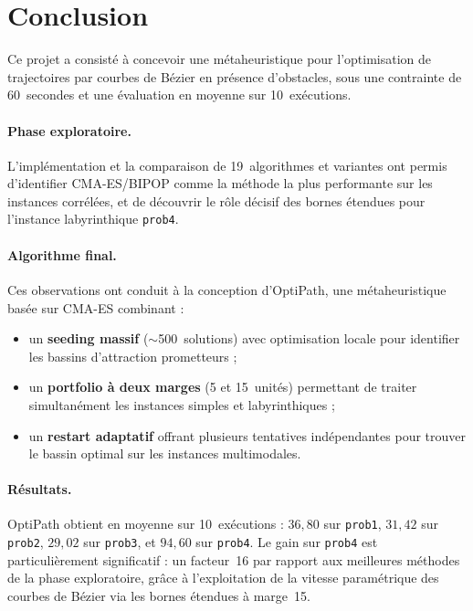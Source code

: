 \section{Conclusion}
\label{sec:conclusion}

Ce projet a consisté à concevoir une métaheuristique pour l'optimisation de
trajectoires par courbes de Bézier en présence d'obstacles, sous une contrainte
de 60~secondes et une évaluation en moyenne sur 10~exécutions.

\paragraph{Phase exploratoire.}
L'implémentation et la comparaison de 19~algorithmes et variantes ont permis
d'identifier CMA-ES/BIPOP comme la méthode la plus performante sur les
instances corrélées, et de découvrir le rôle décisif des bornes étendues pour
l'instance labyrinthique \texttt{prob4}.

\paragraph{Algorithme final.}
Ces observations ont conduit à la conception d'OptiPath, une métaheuristique
basée sur CMA-ES combinant :
\begin{itemize}[nosep]
  \item un \textbf{seeding massif} ($\sim$500~solutions) avec optimisation
        locale pour identifier les bassins d'attraction prometteurs ;
  \item un \textbf{portfolio à deux marges} (5 et 15~unités) permettant de
        traiter simultanément les instances simples et labyrinthiques ;
  \item un \textbf{restart adaptatif} offrant plusieurs tentatives
        indépendantes pour trouver le bassin optimal sur les instances
        multimodales.
\end{itemize}

\paragraph{Résultats.}
OptiPath obtient en moyenne sur 10~exécutions : $36{,}80$ sur \texttt{prob1},
$31{,}42$ sur \texttt{prob2}, $29{,}02$ sur \texttt{prob3}, et $94{,}60$ sur
\texttt{prob4}.  Le gain sur \texttt{prob4} est particulièrement significatif :
un facteur~16 par rapport aux meilleures méthodes de la phase exploratoire,
grâce à l'exploitation de la vitesse paramétrique des courbes de Bézier via les
bornes étendues à marge~15.

